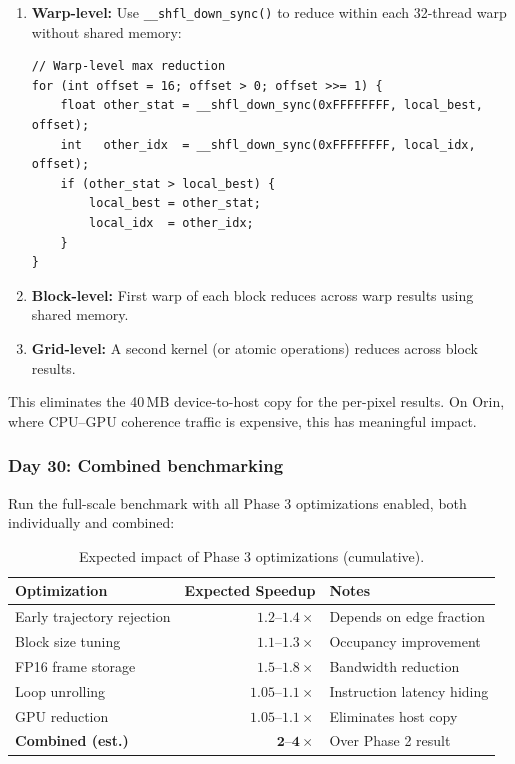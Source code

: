 \documentclass[11pt,letterpaper]{article}
\begin{document}
\begin{enumerate}[leftmargin=2em]
    \item \textbf{Warp-level:} Use \texttt{\_\_shfl\_down\_sync()} to
    reduce within each 32-thread warp without shared memory:

\begin{lstlisting}[style=cudastyle]
// Warp-level max reduction
for (int offset = 16; offset > 0; offset >>= 1) {
    float other_stat = __shfl_down_sync(0xFFFFFFFF, local_best, offset);
    int   other_idx  = __shfl_down_sync(0xFFFFFFFF, local_idx, offset);
    if (other_stat > local_best) {
        local_best = other_stat;
        local_idx  = other_idx;
    }
}
\end{lstlisting}

    \item \textbf{Block-level:} First warp of each block reduces across
    warp results using shared memory.

    \item \textbf{Grid-level:} A second kernel (or atomic operations)
    reduces across block results.
\end{enumerate}

\noindent This eliminates the 40\,MB device-to-host copy for the
per-pixel results. On Orin, where CPU--GPU coherence traffic is expensive,
this has meaningful impact.

\subsubsection{Day 30: Combined benchmarking}

Run the full-scale benchmark with all Phase 3 optimizations enabled,
both individually and combined:

\begin{table}[h]
\centering
\caption{Expected impact of Phase 3 optimizations (cumulative).}
\begin{tabular}{@{}lrl@{}}
\toprule
\textbf{Optimization} & \textbf{Expected Speedup} & \textbf{Notes} \\
\midrule
Early trajectory rejection  & $1.2$--$1.4\times$   & Depends on edge fraction \\
Block size tuning           & $1.1$--$1.3\times$   & Occupancy improvement \\
FP16 frame storage          & $1.5$--$1.8\times$   & Bandwidth reduction \\
Loop unrolling              & $1.05$--$1.1\times$  & Instruction latency hiding \\
GPU reduction               & $1.05$--$1.1\times$  & Eliminates host copy \\
\midrule
\textbf{Combined (est.)}    & $\mathbf{2}$--$\mathbf{4\times}$ & Over Phase 2 result \\
\bottomrule
\end{tabular}
\end{table}
\end{document}
